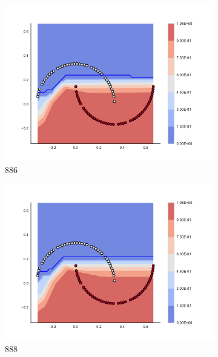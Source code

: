 \begin{figure}[h]
\begin{subfigure}[b]{0.09\textwidth}
    \includegraphics[clip, trim=2.35cm 1.75cm 4.5cm 0cm,width=\textwidth]{img/convergence/886.pdf}
    \caption{886}
    \label{fig:convergence_886}
\end{subfigure}
%
\begin{subfigure}[b]{0.09\textwidth}
    \includegraphics[clip, trim=2.35cm 1.75cm 4.5cm 0cm,width=\textwidth]{img/convergence/888.pdf}
    \caption{888}
    \label{fig:convergence_888}
\end{subfigure}
%
\begin{subfigure}[b]{0.09\textwidth}

\end{subfigure}
\end{figure}
